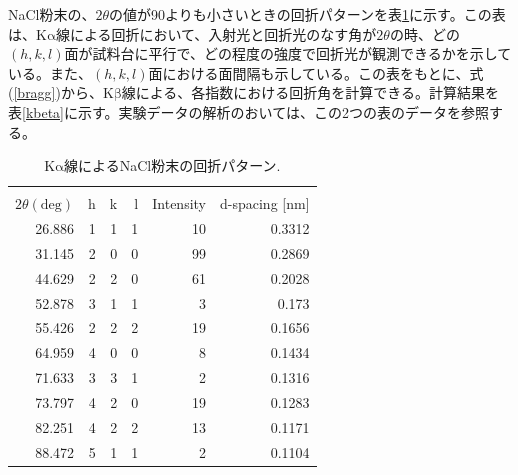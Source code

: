 \documentclass[11pt,a4j,uplatex]{jsarticle}
\begin{document}
NaCl粉末の、$2\theta$の値が90よりも小さいときの回折パターンを表\ref{data}に示す。この表は、$\mathrm{K\alpha}$線による回折において、入射光と回折光のなす角が$2\theta$の時、どの$(h,k,l)$面が試料台に平行で、どの程度の強度で回折光が観測できるかを示している。また、$(h,k,l)$面における面間隔も示している。この表をもとに、式(\ref{bragg})から、$\mathrm{K\beta}$線による、各指数における回折角を計算できる。計算結果を表\ref{kbeta}に示す。実験データの解析のおいては、この2つの表のデータを参照する。

\begin{table}[htbp]
 \begin{center}
  \caption{$\mathrm{K\alpha}$線によるNaCl粉末の回折パターン\cite{powder}.}
  \begin{tabular}{|r|r|r|r|r|r|}  \hline
                           & \multicolumn{3}{c|}{} &   &                                \\
   $2\theta(\mathrm{deg})$ & h                     & k & l & Intensity & d-spacing [nm] \\  \hline \hline
   26.886                  & 1                     & 1 & 1 & 10        & 0.3312         \\
   31.145                  & 2                     & 0 & 0 & 99        & 0.2869         \\
   44.629                  & 2                     & 2 & 0 & 61        & 0.2028         \\
   52.878                  & 3                     & 1 & 1 & 3         & 0.173          \\
   55.426                  & 2                     & 2 & 2 & 19        & 0.1656         \\
   64.959                  & 4                     & 0 & 0 & 8         & 0.1434         \\
   71.633                  & 3                     & 3 & 1 & 2         & 0.1316         \\
   73.797                  & 4                     & 2 & 0 & 19        & 0.1283         \\
   82.251                  & 4                     & 2 & 2 & 13        & 0.1171         \\
   88.472                  & 5                     & 1 & 1 & 2         & 0.1104         \\ \hline
  \end{tabular}
  \label{data}
 \end{center}
\end{table}
\end{document}
